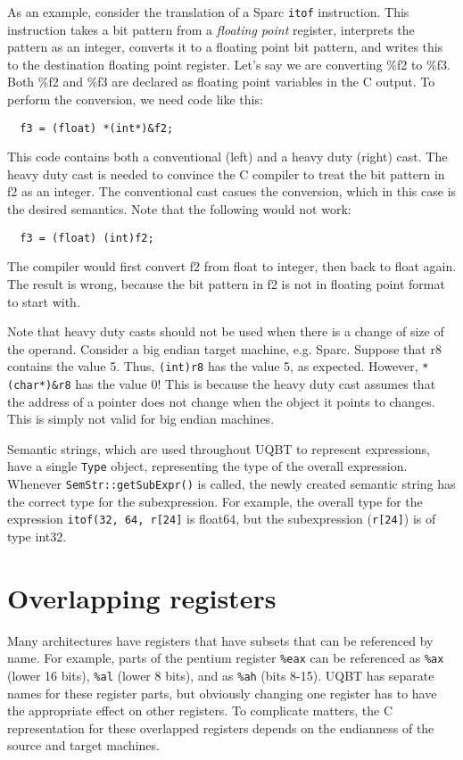 As an example, consider the translation of a Sparc \texttt{itof}
instruction. This instruction takes a bit pattern from a \emph{floating
point} register, interprets the pattern as an integer, converts it to a
floating point bit pattern, and writes this to the destination floating
point register. Let's say we are converting \%f2 to \%f3. Both \%f2 and
\%f3 are declared as floating point variables in the C output. To perform
the conversion, we need code like this:
\begin{verbatim}
  f3 = (float) *(int*)&f2;
\end{verbatim}
This code contains both a conventional (left) and a heavy duty (right) cast.
The heavy duty cast is needed to convince the C compiler to treat the bit
pattern in f2 as an integer. The conventional cast casues the conversion,
which in this case is the desired semantics. Note that the following would
not work:
\begin{verbatim}
  f3 = (float) (int)f2;
\end{verbatim}
The compiler would first convert f2 from float to integer, then back to float
again. The result is wrong, because the bit pattern in f2 is not in floating
point format to start with.

Note that heavy duty casts should not be used when there is a change of size
of the operand. Consider a big endian target machine, e.g. Sparc. Suppose that
r8 contains the value 5. Thus, \texttt{(int)r8} has the value 5, as expected.
However, \texttt{*(char*)\&r8} has the value 0! This is because the heavy
duty cast assumes that the address of a pointer does not change when the
object it points to changes. This is simply not valid for big endian
machines.

Semantic strings, which are used throughout UQBT to represent expressions,
have a single \texttt{Type} object, representing the type of the overall
expression. Whenever \texttt{SemStr::getSubExpr()} is called, the newly
created semantic string has the correct type for the subexpression. For
example, the overall type for the expression \texttt{itof(32, 64, r[24]}
is float64, but the subexpression (\texttt{r[24]}) is of type int32.
 

\section{Overlapping registers}

Many architectures have registers that have subsets that can be referenced
by name. For example, parts of the pentium register \texttt{\%eax} can be
referenced as \texttt{\%ax} (lower 16 bits), \texttt{\%al} (lower 8 bits),
and as \texttt{\%ah} (bits 8-15). UQBT has separate names for these register
parts, but obviously changing one register has to have the appropriate
effect on other registers. To complicate matters, the C representation for
these overlapped registers depends on the endianness of the source and target
machines.

